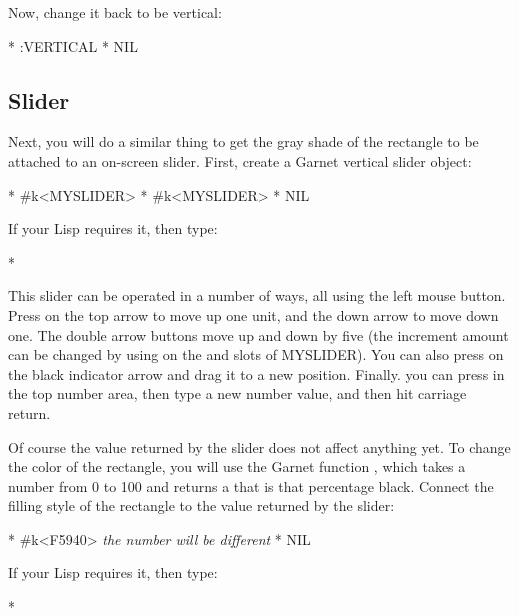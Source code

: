 Now, change it back to be vertical:
\begin{programexample}
* 
:VERTICAL
* 
NIL
\end{programexample}

\subsection{Slider}

Next, you will do a similar thing to get the gray shade of the
rectangle to be attached to an on-screen slider.  First, create a Garnet
vertical slider object:
\begin{programexample}
* 
\#k<MYSLIDER>
* 
\#k<MYSLIDER>
* 
NIL
\end{programexample}
If your Lisp requires it, then type:
\begin{programexample}
* 
\end{programexample}

This slider can be operated in a number of ways, all using the left mouse
button.  Press on the top arrow to move up one unit, and the down arrow to
move down one.  The double arrow buttons move up and down by five (the
increment amount can be changed by using  on the
 and  slots of MYSLIDER).  You can
also press on
the black indicator arrow and drag it to a new position.  Finally. you can
press in the top number area, then type a new number value, and then hit
carriage return.

Of course the value returned by the slider does not affect anything yet.
To change the color of the rectangle, you will use the Garnet function
, which takes a number from 0 to 100 and returns a
 that is that percentage black.  Connect the filling
style of the rectangle to the value returned by the slider:

\begin{programexample}
* 
\#k<F5940>   {\it the number will be different}
* 
NIL
\end{programexample}
If your Lisp requires it, then type:
\begin{programexample}
* 
\end{programexample}

